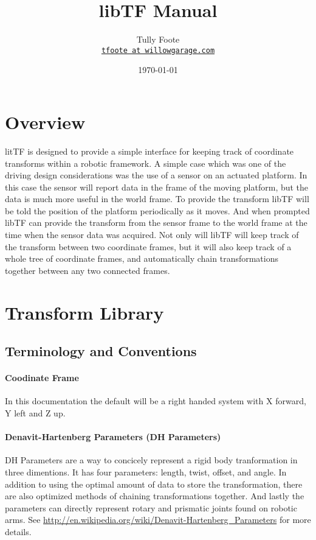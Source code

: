 \documentclass[12pt]{article}
\begin{document}
\title{libTF Manual}
\author{Tully Foote\\
\href{mailto:tfoote@willowgarage.com}{\texttt{tfoote at willowgarage.com}}}
\date{\today}
\maketitle

\tableofcontents
\pagebreak

\section{Overview}
litTF is designed to provide a simple interface for keeping track 
of coordinate transforms within a robotic framework.  
A simple case which was one of the driving design considerations was
the use of a sensor on an actuated platform.  In this case the sensor
will report data in the frame of the moving platform, but the data is much 
more useful in the world frame. To provide the transform libTF will be told 
the position of the platform periodically as it moves.  And when prompted libTF can 
provide the transform from the sensor frame to the world frame at the time when the
sensor data was acquired.  Not only will libTF will keep track of the transform between 
two coordinate frames, but it will also keep track of a whole tree of coordinate frames, 
and automatically chain transformations together between any two connected frames.  

\section{Transform Library}

\subsection{Terminology and Conventions}
\paragraph {Coodinate Frame}
In this documentation the default 
will be a right handed system with X forward, Y left and Z up. 

\paragraph {Denavit-Hartenberg Parameters (DH Parameters)}
DH Parameters are a way to concicely represent a rigid body tranformation in three dimentions.  
It has four parameters: length, twist, offset, and angle.  In addition to using the optimal 
amount of data to store the transformation, there are also optimized methods of chaining 
transformations together.  And lastly the parameters can directly represent rotary and prismatic
joints found on robotic arms.  
See \url{http://en.wikipedia.org/wiki/Denavit-Hartenberg_Parameters} for more details.  
\end{document}
